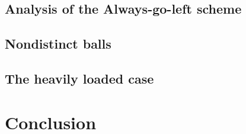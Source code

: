 \documentclass[a4paper,12pt]{article}
\begin{document}
\subsection{Analysis of the Always-go-left scheme}
\label{sec:analysis:alg}

\subsection{Nondistinct balls}
\label{sec:analysis:nondistinctBalls}

\subsection{The heavily loaded case}
\label{sec:analysis:moreBalls}

\section{Conclusion}
\label{sec:conclusion}


 
\end{document}
